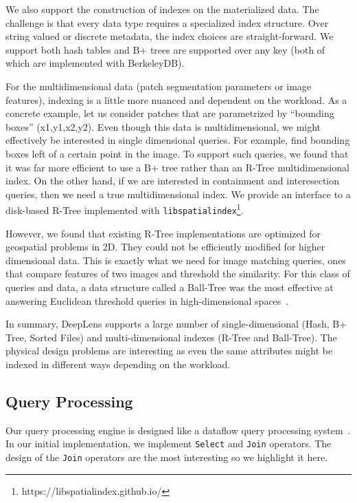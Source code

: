 We also support the construction of indexes on the materialized data.
The challenge is that every data type requires a specialized index structure.
Over string valued or discrete metadata, the index choices are straight-forward. 
We support both hash tables and B+ trees are supported over any key (both of which are implemented with BerkeleyDB).

For the multidimensional data (patch segmentation parameters or image features), indexing is a little more nuanced and dependent on the workload.
As a concrete example, let us consider patches that are parametrized by ``bounding boxes'' (x1,y1,x2,y2).
Even though this data is multidimensional, we might effectively be interested in single dimensional queries.
For example, find bounding boxes left of a certain point in the image.
To support such queries, we found that it was far more efficient to use a B+ tree rather than an R-Tree multidimensional index.
On the other hand, if we are interested in containment and interesection queries, then we need a true multidimensional index.
We provide an interface to a disk-based R-Tree implemented with \texttt{libspatialindex}\footnote{https://libspatialindex.github.io/}.

However, we found that existing R-Tree implementations are optimized for geospatial problems in 2D.
They could not be efficiently modified for higher dimensional data.
This is exactly what we need for image matching queries, ones that compare features of two images and threshold the similarity.
For this class of queries and data, a data structure called a Ball-Tree was the most effective at answering Euclidean threshold queries in high-dimensional spaces~\cite{kumar2008good}.

In summary, \textsf{DeepLens} supports a large number of single-dimensional (Hash, B+ Tree, Sorted Files) and multi-dimensional indexes (R-Tree and Ball-Tree). The physical design problems are interesting as even the same attributes might be indexed in different ways depending on the workload.

\subsection{Query Processing}
Our query processing engine is designed like a dataflow query processing system~\cite{graefe1994volcano}.
In our initial implementation, we implement \texttt{Select} and \texttt{Join} operators. The design of the \texttt{Join} operators are the most interesting so we highlight it here.  

